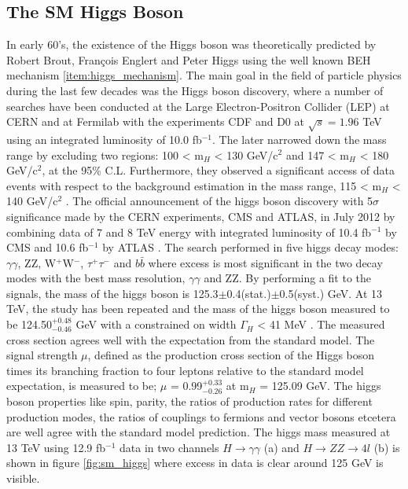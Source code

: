 \subsection{The SM Higgs Boson}
In early 60's, the existence of the Higgs boson was theoretically predicted by Robert Brout, Fran\c cois Englert and Peter Higgs using the well known BEH mechanism \ref{item:higgs_mechanism}. The main goal in the field of particle physics during the last few decades was the Higgs boson discovery, where a number of searches have been conducted at the Large Electron-Positron Collider (LEP) at CERN and at Fermilab with the experiments CDF and D0 at $\sqrt{s} = 1.96$ TeV using an integrated luminosity of 10.0 fb$^{-1}$. The later narrowed down the mass range by excluding two regions: 100 < m$_{H}$ < 130 GeV/c$^{2}$ and 147 < m$_{H}$ < 180 GeV/c$^{2}$, at the 95\% C.L. Furthermore, they observed a significant access of data events with respect to the background estimation in the
mass range, 115 < m$_{H}$ < 140 GeV/c$^{2}$ \cite{sm_higgs_fermilab}. The official announcement of the higgs boson discovery with 5$\sigma$ significance made by the CERN experiments, CMS and ATLAS, in July 2012 by combining data of 7 and 8 TeV energy with integrated luminosity of 10.4 fb$^{-1}$ by CMS and 10.6 fb$^{-1}$ by ATLAS \cite{cms_sm_higgs,atlas_sm_higgs}. The search performed in five higgs decay modes: $\gamma\gamma$, ZZ, W$^{+}$W$^{-}$, $\tau^{+}\tau^{-}$ and $b\bar{b}$ where excess is most significant in the two decay modes with the best mass resolution, $\gamma\gamma$ and ZZ. By performing a fit to the signals, the mass of the higgs boson is 125.3$\pm$0.4(stat.)$\pm$0.5(syst.) GeV. At 13 TeV, the study has been repeated and the mass of the higgs boson measured to be 124.50$^{+0.48}_{-0.46}$ GeV with a constrained on width $\Gamma_{H}$ < 41 MeV \cite{sm_higgs_13tev}. The measured cross section agrees well with the expectation from the standard model. The signal strength $\mu$, defined as the production cross section of the Higgs boson times its branching fraction to four leptons relative to the standard model expectation, is measured to be; $\mu$ = 0.99$^{+0.33}_{-0.26}$ at m$_{H}$ = 125.09 GeV. The higgs boson properties like spin, parity, the ratios of production rates for different production modes, the ratios of couplings to fermions and vector bosons etcetera are well agree with the standard model prediction. The higgs mass measured at 13 TeV using 12.9 fb$^{-1}$ data in two channels $H\rightarrow\gamma\gamma$ (a) and $H\rightarrow ZZ\rightarrow 4l$ (b) is shown in figure \ref{fig:sm_higgs} where excess in data is clear around 125 GeV is visible. 
   

